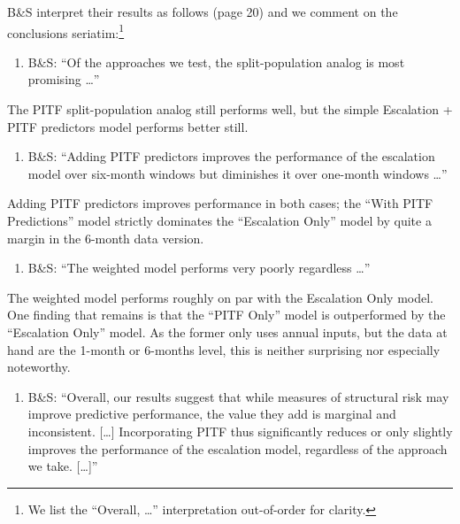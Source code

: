 \documentclass[
]{article}
\providecommand{\tightlist}{%
  \setlength{\itemsep}{0pt}\setlength{\parskip}{0pt}}
\begin{document}
B\&S interpret their results as follows (page 20) and we comment on the conclusions seriatim:\footnote{We list the ``Overall, \ldots{}'' interpretation out-of-order for clarity.}

\begin{enumerate}
\def\labelenumi{\arabic{enumi}.}
\tightlist
\item
  B\&S: ``Of the approaches we test, the split-population analog is most promising \ldots{}''
\end{enumerate}

The PITF split-population analog still performs well, but the simple Escalation + PITF predictors model performs better still.

\begin{enumerate}
\def\labelenumi{\arabic{enumi}.}
\setcounter{enumi}{1}
\tightlist
\item
  B\&S: ``Adding PITF predictors improves the performance of the escalation model over six-month windows but diminishes it over one-month windows \ldots ''
\end{enumerate}

Adding PITF predictors improves performance in both cases; the ``With PITF Predictions'' model strictly dominates the ``Escalation Only'' model by quite a margin in the 6-month data version.

\begin{enumerate}
\def\labelenumi{\arabic{enumi}.}
\setcounter{enumi}{2}
\tightlist
\item
  B\&S: ``The weighted model performs very poorly regardless \ldots ''
\end{enumerate}

The weighted model performs roughly on par with the Escalation Only model. One finding that remains is that the ``PITF Only'' model is outperformed by the ``Escalation Only'' model. As the former only uses annual inputs, but the data at hand are the 1-month or 6-months level, this is neither surprising nor especially noteworthy.

\begin{enumerate}
\def\labelenumi{\arabic{enumi}.}
\setcounter{enumi}{3}
\tightlist
\item
  B\&S: ``Overall, our results suggest that while measures of structural risk may improve predictive performance, the value they add is marginal and inconsistent. {[}\ldots{]} Incorporating PITF thus significantly reduces or only slightly improves the performance of the escalation model, regardless of the approach we take. {[}\ldots{]}''
\end{enumerate}
\end{document}
